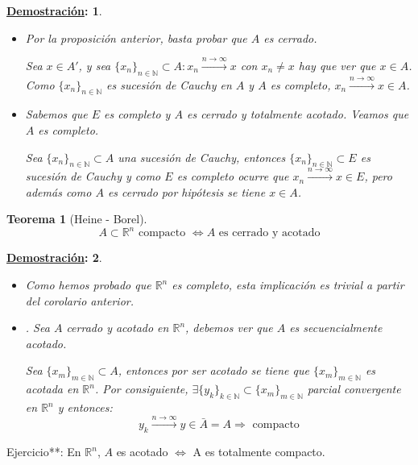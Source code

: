 \documentclass[10pt,a4paper,openright]{book}
\theoremstyle{break}
\newtheorem*{theo}{Teorema}
\newtheorem*{demo}{\underline{Demostración}:}
\begin{document}
\begin{demo}
\begin{itemize}
\item \fbox{$\Rightarrow$} Por la proposición anterior, basta probar que $A$ es cerrado. 

Sea $x\in A'$, y sea $\{x_n\}_{n \in \mathbb{N}} \subset A: x_n \xrightarrow{n\rightarrow\infty} x$ con $x_n \neq x$ hay que ver que $x \in A$. Como $\{x_n\}_{n \in \mathbb{N}}$ es sucesión de Cauchy en $A$ y $A$ es completo, $x_n \xrightarrow{n\rightarrow\infty} x \in A$.

\item \fbox{$\Leftarrow$} Sabemos que $E$ es completo y $A$ es cerrado y totalmente acotado. Veamos que $A$ es completo.

Sea $\{x_n\}_{n \in \mathbb{N}} \subset A$ una sucesión de Cauchy, entonces $\{x_n\}_{n \in \mathbb{N}} \subset E$ es sucesión de Cauchy y como $E$ es completo ocurre que $x_n \xrightarrow{n\rightarrow\infty} x \in E$, pero además como $A$ es cerrado por hipótesis se tiene $x \in A$.
\end{itemize}
\end{demo}

\begin{theo}[Heine - Borel]
$$A \subset \mathbb{R}^n \mbox{ compacto }\Leftrightarrow A \mbox{ es cerrado y acotado}$$
\end{theo}

\begin{demo}
\begin{itemize}
\item \fbox{$\Rightarrow$} Como hemos probado que $\mathbb{R}^n$ es completo, esta implicación es trivial a partir del corolario anterior.

\item \fbox{$\Leftarrow$}. Sea $A$ cerrado y acotado en $\mathbb{R}^n$, debemos ver que $A$ es secuencialmente acotado.

Sea $\{x_m\}_{m \in \mathbb{N}} \subset A$, entonces por ser acotado se tiene que $\{x_m\}_{m \in \mathbb{N}}$ es acotada en $\mathbb{R}^n$. Por consiguiente, $\exists \{y_k\}_{k \in \mathbb{N}} \subset \{x_m\}_{m \in \mathbb{N}}$ parcial convergente en $\mathbb{R}^n$ y entonces:
$$y_k \xrightarrow{n\rightarrow\infty} y \in \bar{A} = A \Rightarrow\mbox{ compacto}$$
\end{itemize}
\end{demo}

Ejercicio**: En $\mathbb{R}^n$, $A$ es acotado $\Leftrightarrow$ A es totalmente compacto.
\end{document}
